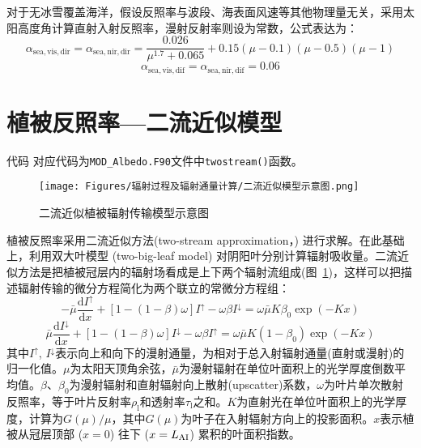 对于无冰雪覆盖海洋，假设反照率与波段、海表面风速等其他物理量无关，采用太阳高度角计算直射入射反照率，漫射反射率则设为常数，公式表达为：
\begin{equation}
  \alpha_{\mathrm{sea,vis,dir}}=\alpha_{\mathrm{sea,nir,dir}} = \frac{0.026}{\mu^{1.7}+0.065}+0.15(\mu-0.1)(\mu-0.5)(\mu-1)
\end{equation}
%
\begin{equation}
  \alpha_{\mathrm{sea,vis,dif}}=\alpha_{\mathrm{sea,nir,dif}} = 0.06
\end{equation}

\section{植被反照率---二流近似模型}\label{植被反照率二流近似模型}
\begin{mymdframed}{代码}
  对应代码为\texttt{MOD\_Albedo.F90}文件中\texttt{twostream()}函数。
\end{mymdframed}

{
  \begin{figure}[htbp]
    \centering
    \texttt{[image: Figures/辐射过程及辐射通量计算/二流近似模型示意图.png]}
    \caption{二流近似植被辐射传输模型示意图}
    \label{fig:二流近似模型示意图}
  \end{figure}
}
植被反照率采用二流近似方法(two-stream approximation，\citet{dickinson1983land,sellers1985canopy}) 进行求解。在此基础上，利用双大叶模型 (two-big-leaf model) \citep{dai2004two} 对阴阳叶分别计算辐射吸收量。二流近似方法是把植被冠层内的辐射场看成是上下两个辐射流组成(图~\ref{fig:二流近似模型示意图})，这样可以把描述辐射传输的微分方程简化为两个联立的常微分方程组：
\begin{equation}\label{di_dx1}
  -\bar{\mu} \frac{{\mathrm d} I^{\uparrow}}{{\mathrm d} x}+\left[1-(1-\beta) \omega\right] I^{\uparrow}-\omega \beta I^{\downarrow}=\omega \bar{\mu} K \beta_{0} \exp (-K x)
\end{equation}
\begin{equation}\label{di_dx2}
  \bar{\mu} \frac{{\mathrm d} I^{\downarrow}}{{\mathrm d} x}+\left[1-(1-\beta) \omega\right] I^{\downarrow}-\omega \beta I^{\uparrow}=\omega \bar{\mu} K\left(1-\beta_{0}\right) \exp (-K x)
\end{equation}
其中$I^{\uparrow}$, $I^{\downarrow}$表示向上和向下的漫射通量，为相对于总入射辐射通量(直射或漫射)的归一化值。$\mu$为太阳天顶角余弦，$\bar{\mu}$为漫射辐射在单位叶面积上的光学厚度倒数平均值。$\beta$、$\beta_{0}$为漫射辐射和直射辐射向上散射(upscatter)系数，$\omega$为叶片单次散射反照率，等于叶片反射率$\rho_{\mathrm{l}}$和透射率$\tau_{\mathrm{l}}$之和。$K$为直射光在单位叶面积上的光学厚度，计算为$G(\mu) / \mu$，其中$G(\mu)$为叶子在入射辐射方向上的投影面积。$x$表示植被从冠层顶部 ($x=0$) 往下 ($x=L_{\rm AI}$) 累积的叶面积指数。

